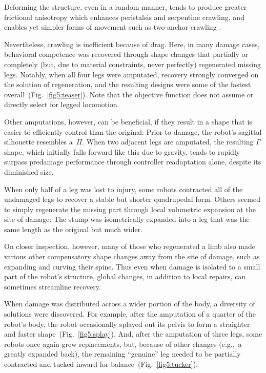 Deforming the structure, even in a random manner, tends to produce greater frictional anisotropy which enhances peristalsis and serpentine crawling, and enables yet simpler forms of movement such as two-anchor crawling \cite{alexander2003principles}.

Nevertheless, crawling is inefficient because of drag.
Here, in many damage cases, behavioral competence was recovered through shape changes that partially or completely (but, due to material constraints, never perfectly) regenerated missing legs.
Notably, when all four legs were amputated, recovery strongly converged on the solution of regeneration, and the resulting designs were some of the fastest overall~(Fig.~\ref{fig5:teaser}).
Note that the objective function does not assume or directly select for legged locomotion.


Other amputations, however, can be beneficial, if they result in a shape that is easier to efficiently control than the original:
Prior to damage, the robot's sagittal silhouette resembles a~$\Pi$.
When two adjacent legs are amputated, the resulting $\Gamma$ shape, which initially falls forward like this  due to gravity, tends to rapidly surpass predamage performance through controller readaptation alone, despite its diminished size.

When only half of a leg was lost to injury, some robots contracted all of the undamaged legs to recover a stable but shorter quadrupedal form.
Others seemed to simply regenerate the missing part through local volumetric expansion at the site of damage:
The stump was isometrically expanded into a leg that was the same length as the original but much wider.

On closer inspection, however, many of those who regenerated a limb also made various other compensatory shape changes away from the site of damage, such as expanding and curving their spine.
Thus even when damage is isolated to a small part of the robot's structure,
global changes, in addition to local repairs, can sometimes streamline recovery.


When damage was distributed across a wider portion of the body, a diversity of solutions were discovered.
For example, after the amputation of a quarter of the robot's body, the robot occasionally splayed out its pelvis to form a straighter and faster shape~(Fig.~\ref{fig5:splay}).
And, after the amputation of three legs, some robots once again grew replacements, but, because of other changes (e.g.,~a greatly expanded back),
the remaining ``genuine'' leg needed to be partially contracted and tucked inward for balance~(Fig.~\ref{fig5:tucker}).

